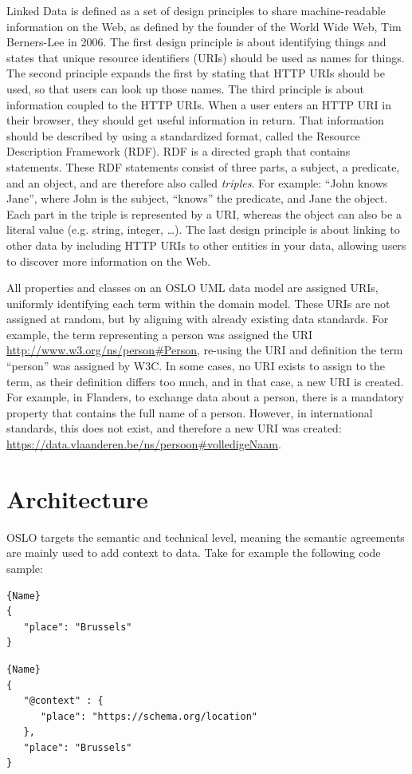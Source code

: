 \documentclass[manuscript]{acmart}
\begin{document}
Linked Data is defined as a set of design principles to share machine-readable information on the Web, as defined by the founder of the World Wide Web, Tim Berners-Lee in 2006. 
The first design principle is about identifying things and states that unique resource identifiers (URIs) should be used as names for things. 
The second principle expands the first by stating that HTTP URIs should be used, so that users can look up those names. 
The third principle is about information coupled to the HTTP URIs. 
When a user enters an HTTP URI in their browser, they should get useful information in return. 
That information should be described by using a standardized format, called the Resource Description Framework (RDF). 
RDF is a directed graph that contains statements. 
These RDF statements consist of three parts, a subject, a predicate, and an object, and are therefore also called \textit{triples}. 
For example: ``John knows Jane'', where John is the subject, ``knows'' the predicate, and Jane the object. 
Each part in the triple is represented by a URI, whereas the object can also be a literal value (e.g. string, integer, …). 
The last design principle is about linking to other data by including HTTP URIs to other entities in your data, allowing users to discover more information on the Web.

All properties and classes on an OSLO UML data model are assigned URIs, uniformly identifying each term within the domain model.
These URIs are not assigned at random, but by aligning with already existing data standards. 
For example, the term representing a person was assigned the URI \url{http://www.w3.org/ns/person#Person}, re-using the URI and definition the term ``person'' was assigned by W3C.
In some cases, no URI exists to assign to the term, as their definition differs too much, and in that case, a new URI is created.
For example, in Flanders, to exchange data about a person, there is a mandatory property that contains the full name of a person.
However, in international standards, this does not exist, and therefore a new URI was created: \url{https://data.vlaanderen.be/ns/persoon#volledigeNaam}.

\section{Architecture}

OSLO targets the semantic and technical level, meaning the semantic agreements are mainly used to add context to data. Take for example the following code sample:
\noindent
\begin{lstlisting}[caption=JSON data snippet,frame=tlrb, label={lst:json}]{Name}
{
   "place": "Brussels"
}
\end{lstlisting}\hfill
\begin{lstlisting}[caption=JSON-LD data snippet,frame=tlrb, label={lst:jsonld}]{Name}
{
   "@context" : {
      "place": "https://schema.org/location"
   },
   "place": "Brussels"
}
\end{lstlisting}
\end{document}
